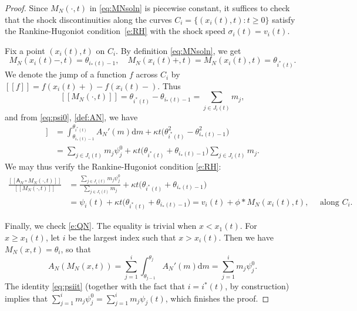 \documentclass[10pt,a4paper]{amsart}
\def\dd{\mathrm{d}}
\def\A{\mathsf{A}}
\def\s{\sigma}
\begin{document}
	\begin{proof}
		Since $M_N(\cdot, t)$ in \eqref{eq:MNsoln} is piecewise constant, it suffices to check that the shock discontinuities along the curves $C_i = \{(x_i(t), t):t\ge 0\}$ satisfy the Rankine-Hugoniot condition~\eqref{e:RH} with the shock speed $\s_i(t)=v_i(t)$.
		
		Fix a point $(x_i(t), t)$ on $C_i$. By definition \eqref{eq:MNsoln}, we get 
		\[
		M_N(x_i(t)-,t) = \theta_{i_*(t)-1},\quad M_N(x_i(t)+,t)=M_N(x_i(t),t)=\theta_{i^*(t)}.
		\]
		We denote the jump of a function $f$ across $C_i$ by $[[f]] = f(x_i(t)+) - f(x_i(t)-)$. Thus
		\[
		[[M_N(\cdot, t)]] = \theta_{i^*(t)}-\theta_{i_*(t)-1}=\sum_{j\in J_i(t)} m_j,
		\]
		and from \eqref{eq:psi0}, \eqref{def:AN}, we have
		\begin{align*}
			[[ \A_N ( M_N(\cdot, t),t)]] & = 
			\int_{\theta_{i_*(t)-1}}^{\theta_{i^*(t)}} A_N'(m)\dd m + \kappa t \big(\theta_{i^*(t)}^2-\theta_{i_*(t)-1}^2\big)\\ 
			& = \sum_{j\in J_i(t)} m_j \psi_j^0 + \kappa t \big(\theta_{i^*(t)}+\theta_{i_*(t)-1}\big) \sum_{j\in J_i(t)} m_j.
		\end{align*}
		We may thus verify the Rankine-Hugoniot condition \eqref{e:RH}:
		\begin{align*}
			\frac{[[\A_N\circ M_N(\cdot, t)]]}{[[M_N(\cdot, t)]]} & = \frac{\sum_{j\in J_i(t)} m_j \psi_j^0}{\sum_{j\in J_i(t)} m_j} + \kappa t \big(\theta_{i^*(t)}+\theta_{i_*(t)-1}\big)\\
			& = \psi_i(t) + \kappa t \big(\theta_{i^*(t)}+\theta_{i_*(t)-1}\big) = v_i(t) + \phi\ast M_N(x_i(t),t), \quad \text{ along }C_i.
		\end{align*}
		
		
		
		Finally, we check \eqref{e:QN}. The equality is trivial when $x<x_1(t)$. For $x\ge x_1(t)$, let $i$ be the largest index such that $x>x_i(t)$.  Then we have $M_N(x,t)=\theta_i$, so that
		\[
		A_N(M_N(x,t))=\sum_{j=1}^i\int_{\theta_{j-1}}^{\theta_j}A_N'(m)\dd m
		=\sum_{j=1}^im_j\psi_j^0.
		\]
		The identity \eqref{eq:psiit} (together with the fact that $i = i^*(t)$, by construction) implies that
		$\sum_{j=1}^im_j\psi_j^0=\sum_{j=1}^i m_j\psi_j(t)$, which finishes the proof.
	\end{proof}


	
	
\end{document}
